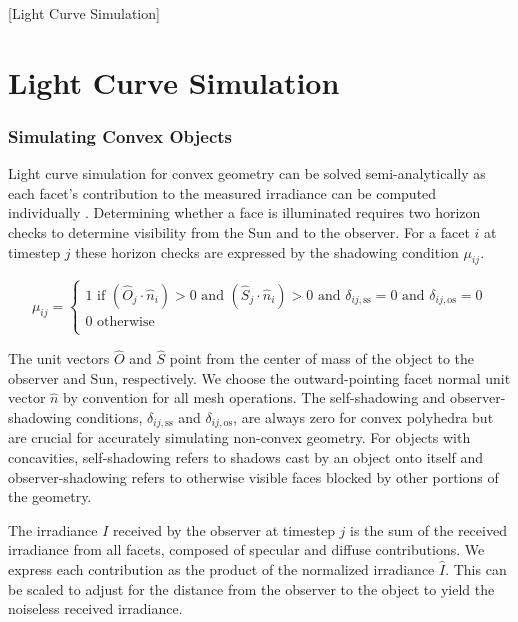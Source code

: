 [Light Curve Simulation]

\chapter{Light Curve Simulation}

\subsection{Simulating Convex Objects}

Light curve simulation for convex geometry can be solved semi-analytically as each facet's contribution 
to the measured irradiance can be computed individually \cite{kaasalainen2001}. 
Determining whether a face is illuminated requires two horizon checks to determine visibility 
from the Sun and to the observer. For a facet $i$ at timestep $j$ these horizon checks are 
expressed by the shadowing condition $\mu_{ij}$. 

\begin{equation} \label{eq:cvx_shadow_cond}
  \mu_{ij} = \begin{cases}
    1 \text{ if } \left( \hat{O}_j \cdot \hat{n}_i \right) > 0 \text{ and } \left( \hat{S}_j \cdot \hat{n}_i \right) > 0 
	  \text{ and } \delta_{ij,\text{ss}} = 0 \text{ and } \delta_{ij,\text{os}} = 0\\
    0 \text{ otherwise } \\
  \end{cases}
\end{equation}

The unit vectors $\hat{O}$ and $\hat{S}$ point from the  center of mass of the object to the observer and Sun, respectively. 
We choose the outward-pointing facet normal unit vector $\hat{n}$ by convention for all mesh operations. 
The self-shadowing and observer-shadowing conditions, $\delta_{ij,\text{ss}}$ and $\delta_{ij,\text{os}}$, 
are always zero for convex polyhedra but are crucial for accurately simulating non-convex geometry. 
For objects with concavities, self-shadowing refers to shadows cast by an object onto itself and observer-shadowing 
refers to otherwise visible faces blocked by other portions of the geometry.

The irradiance $I$ received by the observer at timestep $j$ is the sum of the received irradiance from all facets, 
composed of specular and diffuse contributions. We express each contribution as the product of the
normalized irradiance $\hat{I}$. This can be scaled to adjust for the distance from the observer to
the object to yield the noiseless received irradiance.
